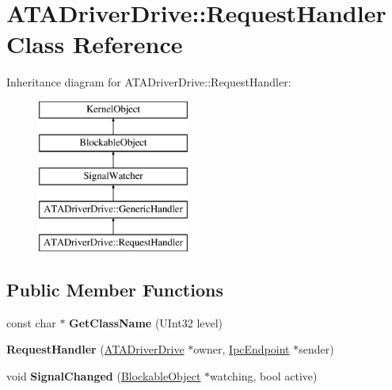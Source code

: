 \hypertarget{class_a_t_a_driver_drive_1_1_request_handler}{}\section{A\+T\+A\+Driver\+Drive\+:\+:Request\+Handler Class Reference}
\label{class_a_t_a_driver_drive_1_1_request_handler}
Inheritance diagram for A\+T\+A\+Driver\+Drive\+:\+:Request\+Handler\+:\begin{figure}[H]
\begin{center}
\leavevmode
\includegraphics[height=5.000000cm]{class_a_t_a_driver_drive_1_1_request_handler}
\end{center}
\end{figure}
\subsection*{Public Member Functions}
\begin{DoxyCompactItemize}
\item 
\mbox{\label{class_a_t_a_driver_drive_1_1_request_handler_ad41daaa7f4126a30ffda9c4aad9ff86f}} 
const char $\ast$ {\bfseries Get\+Class\+Name} (U\+Int32 level)
\item 
\mbox{\label{class_a_t_a_driver_drive_1_1_request_handler_ab6b16803a6624ef2baa1628531f16119}} 
{\bfseries Request\+Handler} (\hyperlink{class_a_t_a_driver_drive}{A\+T\+A\+Driver\+Drive} $\ast$owner, \hyperlink{class_ipc_endpoint}{Ipc\+Endpoint} $\ast$sender)
\item 
\mbox{\label{class_a_t_a_driver_drive_1_1_request_handler_ade86860d36c6ef1d806e675bf37bd7b4}} 
void {\bfseries Signal\+Changed} (\hyperlink{class_blockable_object}{Blockable\+Object} $\ast$watching, bool active)
\end{DoxyCompactItemize}
